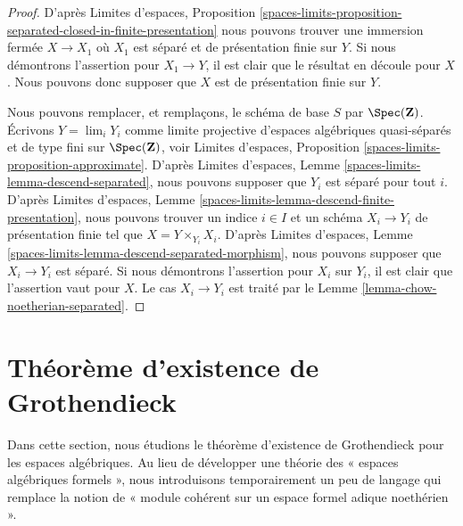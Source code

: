 \begin{proof}
D'après
Limites d'espaces, Proposition
\ref{spaces-limits-proposition-separated-closed-in-finite-presentation}
nous pouvons trouver une immersion fermée $X \to X_1$ où $X_1$ est séparé
et de présentation finie sur $Y$. Si nous démontrons l'assertion
pour $X_1 \to Y$, il est clair que le résultat en découle pour $X$. Nous pouvons donc supposer que
$X$ est de présentation finie sur $Y$.

\medskip\noindent
Nous pouvons remplacer, et remplaçons, le schéma de base $S$ par $\Spec(\mathbf{Z})$.
Écrivons $Y = \lim_i Y_i$ comme limite projective d'espaces algébriques
quasi-séparés et de type fini sur $\Spec(\mathbf{Z})$, voir
Limites d'espaces,
Proposition \ref{spaces-limits-proposition-approximate}.
D'après Limites d'espaces, Lemme \ref{spaces-limits-lemma-descend-separated},
nous pouvons supposer que $Y_i$ est séparé pour tout $i$.
D'après
Limites d'espaces,
Lemme \ref{spaces-limits-lemma-descend-finite-presentation},
nous pouvons
trouver un indice $i \in I$ et un schéma $X_i \to Y_i$ de présentation finie
tel que $X = Y \times_{Y_i} X_i$.
D'après
Limites d'espaces,
Lemme \ref{spaces-limits-lemma-descend-separated-morphism},
nous pouvons supposer que $X_i \to Y_i$ est séparé.
Si nous démontrons l'assertion pour
$X_i$ sur $Y_i$, il est clair que l'assertion vaut pour $X$. Le cas
$X_i \to Y_i$ est traité par le
Lemme \ref{lemma-chow-noetherian-separated}.
\end{proof}






\section{Théorème d'existence de Grothendieck}
\label{section-existence-proper}

\noindent
Dans cette section, nous étudions le théorème d'existence de Grothendieck pour les
espaces algébriques. Au lieu de développer une théorie des « espaces algébriques formels »,
nous introduisons temporairement un peu de langage qui remplace la notion de
« module cohérent sur un espace formel adique noethérien ».

